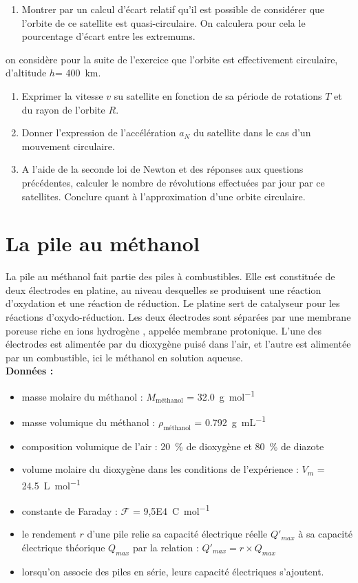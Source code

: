 \documentclass[a4paper,12pt,fleqn]{article}%
\begin{document}
\begin{enumerate}
    \item Montrer par un calcul d'écart relatif qu'il est possible de considérer que l'orbite de ce satellite est quasi-circulaire. On calculera pour cela le pourcentage d'écart entre les extremums.
\end{enumerate}
on considère pour la suite de l'exercice que l'orbite est effectivement circulaire, d'altitude $h$= \SI{400}{km}.
\begin{enumerate}[resume]
    \item Exprimer la vitesse $v$ su satellite en fonction de sa période de rotations $T$ et du rayon de l'orbite $R$.
    \item Donner l'expression de l'accélération $a_N$ du satellite dans le cas d'un mouvement circulaire.
    \item A l'aide de la seconde loi de Newton et des réponses aux questions précédentes, calculer le nombre de révolutions effectuées par jour par ce satellites. Conclure quant à l'approximation d'une orbite circulaire.
\end{enumerate}

\section{La pile au méthanol}

La pile au méthanol fait partie des piles à combustibles. Elle est constituée de deux électrodes en platine, au niveau desquelles se produisent une réaction d’oxydation et une réaction de réduction. Le platine sert de catalyseur pour les réactions d’oxydo-réduction. Les deux électrodes sont séparées par une membrane poreuse riche en ions hydrogène , appelée membrane protonique. L’une des électrodes est alimentée par du dioxygène puisé dans l’air, et l’autre est alimentée par un combustible, ici le méthanol en solution aqueuse.\\
\textbf{Données :}
\begin{itemize}
    \item masse molaire du méthanol : $M_{\text{méthanol}}$ = \SI{32,0}{\gram\per\mole}
    \item masse volumique du méthanol : $\rho_{\text{méthanol}}$ = \SI{0,792}{\gram\per\milli\liter}
    \item composition volumique de l'air : \SI{20}{\percent} de dioxygène et \SI{80}{\percent} de diazote
    \item volume molaire du dioxygène dans les conditions de l'expérience : $V_m$ = \SI{24,5}{\liter\per\mole}
    \item constante de Faraday : $\mathcal{F}$ = \SI{9,5E4}{\coulomb\per\mole}
    \item le rendement $r$ d'une pile relie sa capacité électrique réelle $Q'_{max}$ à sa capacité électrique théorique $Q_{max}$ par la relation : $Q'_{max}= r \times Q_{max}$
    \item lorsqu'on associe des piles en série, leurs capacité électriques s'ajoutent.
\end{itemize}
\end{document}
